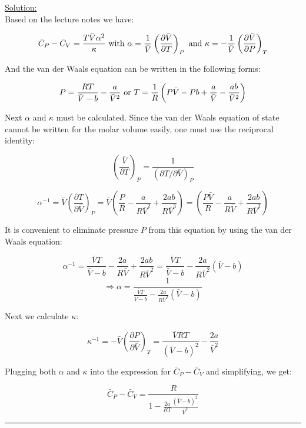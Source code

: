 \noindent
\underline{Solution:}\\

Based on the lecture notes we have:

$$\bar{C}_P - \bar{C}_V = \frac{T\bar{V}\alpha^2}{\kappa}\textnormal{ with }\alpha = \frac{1}{\bar{V}}\left(\frac{\partial\bar{V}}{\partial T}\right)_P\textnormal{ and }\kappa = -\frac{1}{\bar{V}}\left(\frac{\partial\bar{V}}{\partial P}\right)_T$$

And the van der Waals equation can be written in the following forms:

$$P = \frac{RT}{\bar{V} - b} - \frac{a}{\bar{V}^2}\textnormal{ or }T = \frac{1}{R}\left(P\bar{V} - Pb + \frac{a}{\bar{V}} - \frac{ab}{\bar{V}^2}\right)$$

Next $\alpha$ and $\kappa$ must be calculated. Since the van der Waals equation of state cannot be written for the molar volume easily, one must use the reciprocal identity:

$$\left(\frac{\bar{V}}{\partial T}\right)_P = \frac{1}{\left(\partial T / \partial\bar{V}\right)_P}$$

$$\alpha^{-1} = \bar{V}\left(\frac{\partial T}{\partial\bar{V}}\right)_P = \bar{V}\left(\frac{P}{R} - \frac{a}{R\bar{V}^2} + \frac{2ab}{R\bar{V}^3}\right) = \left(\frac{P\bar{V}}{R} - \frac{a}{R\bar{V}} + \frac{2ab}{R\bar{V}^2}\right)$$

It is convenient to eliminate pressure $P$ from this equation by using the van der Waals equation:

$$\alpha^{-1} = \frac{\bar{V}T}{\bar{V} - b} - \frac{2a}{R\bar{V}} + \frac{2ab}{R\bar{V}^2} = \frac{\bar{V}T}{\bar{V} - b} - \frac{2a}{R\bar{V}^2}\left(\bar{V} - b\right)$$
$$\Rightarrow \alpha = \frac{1}{\frac{\bar{V}T}{\bar{V} - b} - \frac{2a}{R\bar{V}^2}\left(\bar{V} - b\right)}$$

Next we calculate $\kappa$:

$$\kappa^{-1} = -\bar{V}\left(\frac{\partial P}{\partial\bar{V}}\right)_T = \frac{\bar{V}RT}{\left(\bar{V} - b\right)^2} - \frac{2a}{\bar{V}^2}$$

Plugging both $\alpha$ and $\kappa$ into the expression for $\bar{C}_P - \bar{C}_V$ and simplifying, we get:

$$\bar{C}_P - \bar{C}_V = \frac{R}{1 - \frac{2a}{RT}\frac{\left(\bar{V} - b\right)^2}{\bar{V}^3}}$$

\hrule\vspace{0.5cm}
